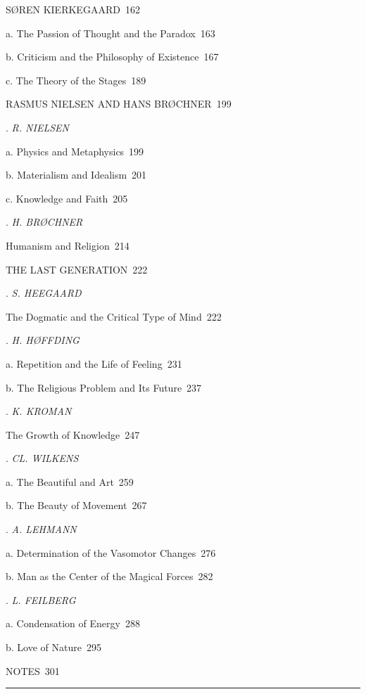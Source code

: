 \documentclass[12pt,a4paper,openany]{book}
\newcommand{\tocline}[3]{\noindent\makebox[2.2em][r]{#1}\hspace{0.6em}#2\dotfill\ #3\par}
\begin{document}
{\tocline{VI.}{SØREN KIERKEGAARD}{162}
\tocline{}{\qquad a. The Passion of Thought and the Paradox}{163}
\tocline{}{\qquad b. Criticism and the Philosophy of Existence}{167}
\tocline{}{\qquad c. The Theory of the Stages}{189}
\tocline{VII.}{RASMUS NIELSEN AND HANS BRØCHNER}{199}
\tocline{}{. \textit{R. NIELSEN}}{}
\tocline{}{\qquad a. Physics and Metaphysics}{199}
\tocline{}{\qquad b. Materialism and Idealism}{201}
\tocline{}{\qquad c. Knowledge and Faith}{205}
\tocline{}{. \textit{H. BRØCHNER}}{}
\tocline{}{\qquad Humanism and Religion}{214}
\tocline{VIII.}{THE LAST GENERATION}{222}
\tocline{}{. \textit{S. HEEGAARD}}{}
\tocline{}{\qquad The Dogmatic and the Critical Type of Mind}{222}
\tocline{}{. \textit{H. HØFFDING}}{}
\tocline{}{\qquad a. Repetition and the Life of Feeling}{231}
\tocline{}{\qquad b. The Religious Problem and Its Future}{237}
\tocline{}{. \textit{K. KROMAN}}{}
\tocline{}{\qquad The Growth of Knowledge}{247}
\tocline{}{. \textit{CL. WILKENS}}{}
\tocline{}{\qquad a. The Beautiful and Art}{259}
\tocline{}{\qquad b. The Beauty of Movement}{267}
\tocline{}{. \textit{A. LEHMANN}}{}
\tocline{}{\qquad a. Determination of the Vasomotor Changes}{276}
\tocline{}{\qquad b. Man as the Center of the Magical Forces}{282}
\tocline{}{. \textit{L. FEILBERG}}{}
\tocline{}{\qquad a. Condensation of Energy}{288}
\tocline{}{\qquad b. Love of Nature}{295}
\tocline{}{NOTES}{301}
}
\begin{center}\rule{3em}{0.4pt}\end{center}
\end{document}
